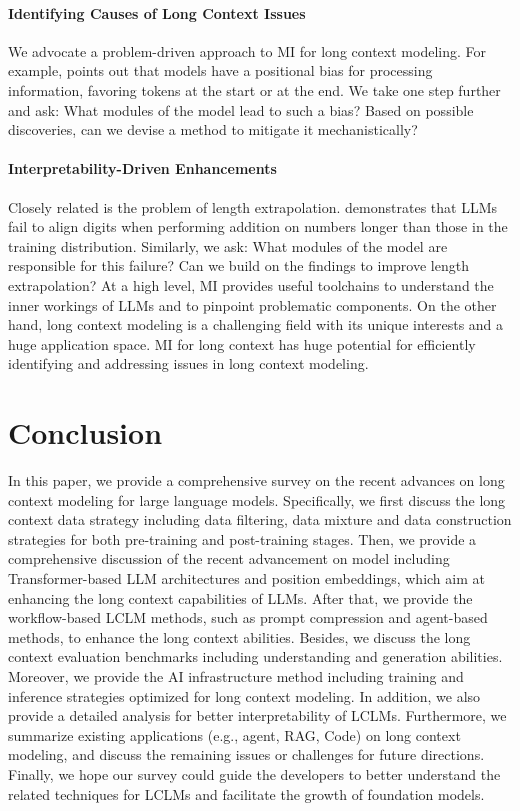 \documentclass[11pt, a4paper, logo, copyright, nonumbering]{map}
\begin{document}
\paragraph{Identifying Causes of Long Context Issues}
We advocate a problem-driven approach to MI for long context modeling. For example, \citet{liu2024lost} points out that models have a positional bias for processing information, favoring tokens at the start or at the end. We take one step further and ask: What modules of the model lead to such a bias? Based on possible discoveries,  can we devise a method to mitigate it mechanistically? 

\paragraph{Interpretability-Driven Enhancements}
Closely related is the problem of length extrapolation. \citet{zhou-etal-2024-num_sys} demonstrates that LLMs fail to align digits when performing addition on numbers longer than those in the training distribution. Similarly, we ask: What modules of the model are responsible for this failure? Can we build on the findings to improve length extrapolation?
At a high level, MI provides useful toolchains to understand the inner workings of LLMs and to pinpoint problematic components. On the other hand, long context modeling is a challenging field with its unique interests and a huge application space. MI for long context has huge potential for efficiently identifying and addressing issues in long context modeling. 


\section{Conclusion}
In this paper, we provide a comprehensive survey on the recent advances on long context modeling for large language models. 
Specifically, we first discuss the long context data strategy including data filtering, data mixture and data construction strategies for both pre-training and post-training stages.
Then, we provide a comprehensive discussion of the recent advancement on model including Transformer-based LLM architectures and position embeddings, which aim at enhancing the long context capabilities of LLMs.
After that, we provide the workflow-based LCLM methods,
such as prompt compression and agent-based methods, to enhance the long context abilities.
Besides, we discuss the long context evaluation benchmarks including understanding and generation abilities.
Moreover, we provide the AI infrastructure method including training and inference strategies optimized for long context modeling.
In addition, we also provide a detailed analysis for better interpretability of LCLMs.
Furthermore, we summarize existing applications (e.g., agent, RAG, Code) on long context modeling,
and discuss the remaining issues or challenges for future directions. 
Finally, we hope our survey could guide the developers to better understand the related techniques for LCLMs and facilitate the growth of foundation models.
\end{document}
